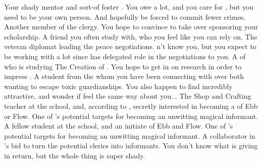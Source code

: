 \documentclass[char]{GL2020}
\begin{document}
\begin{contacts}
	\contact{\cAntiChup{}} Your shady mentor and sort-of foster \cAntiChup{\parent}. You owe \cAntiChup{\them} a lot, and you care for \cAntiChup{\them}, but you need to be your own person. And hopefully be forced to commit fewer crimes.
	\contact{\cBeetle{}} Another member of the \pTech{} clergy. You hope to convince \cBeetle{\them} to take over sponsoring your scholarship.
\contact{\cTechStar{}} A friend you often study with, who you feel like you can rely on.
 	\contact{\cDiplomat{}} The veteran \pTech{} diplomat leading the peace negotiations. \cDiplomat{\They} \cDiplomat{\does}n't know you, but you expect to be working with \cDiplomat{\them} a lot since \cAntiChup{} has delegated \cAntiChup{\their} role in the negotiations to you.
\contact{\cEbbPriest{}} A \pShip{} \cEbbPriest{\cleric} of \cEbb{} who is studying The Creation of \pEarth{}. You hope to get in on \cEbbPriest{\their} research in order to impress \cBeetle{}.
 	\contact{\cAdopted{}} A student from the \pFarm{} whom you have been connecting with over both wanting to escape toxic guardianships. You also happen to find \cAdopted{\them} incredibly attractive, and wonder if \cAdopted{\they} feel\cAdopted{\plural} the same way about you...
	\contact{\cPirate{}} The Shop and Crafting teacher at the school, and, according to \cAntiChup{}, secretly interested in becoming a \cPirate{\cleric} of Ebb or Flow. One of \cAntiChup{}'s potential targets for becoming an unwitting magical informant.
	\contact{\cInitiate{}} A fellow student at the school, and an initiate of Ebb and Flow. One of \cAntiChup{}'s potential targets for becoming an unwitting magical informant.
	\contact{\cPrince{}} A collaborator in \cAntiChup{}'s bid to turn the potential \pShip{} clerics into informants. You don't know what \cAntiChup{} is giving \cPrince{\them} in return, but the whole thing is super shady.
\end{contacts}
\end{document}
